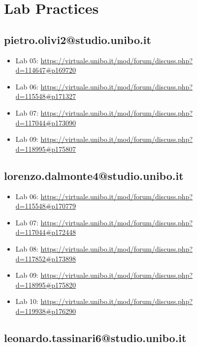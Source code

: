 \documentclass[a4paper,12pt]{report}
\begin{document}
\chapter{Lab Practices}
\section*{pietro.olivi2@studio.unibo.it}
\begin{itemize}
	\item Lab 05: \url{https://virtuale.unibo.it/mod/forum/discuss.php?d=114647#p169720}
	\item Lab 06: \url{https://virtuale.unibo.it/mod/forum/discuss.php?d=115548#p171327}
	\item Lab 07: \url{https://virtuale.unibo.it/mod/forum/discuss.php?d=117044#p173090}
	\item Lab 09: \url{https://virtuale.unibo.it/mod/forum/discuss.php?d=118995#p175807}
\end{itemize}

\section*{lorenzo.dalmonte4@studio.unibo.it}

\begin{itemize}
	\item Lab 06: \url{https://virtuale.unibo.it/mod/forum/discuss.php?d=115548#p170779}
	\item Lab 07: \url{https://virtuale.unibo.it/mod/forum/discuss.php?d=117044#p172448}
	\item Lab 08: \url{https://virtuale.unibo.it/mod/forum/discuss.php?d=117852#p173898}
	\item Lab 09: \url{https://virtuale.unibo.it/mod/forum/discuss.php?d=118995#p175820}
	\item Lab 10: \url{https://virtuale.unibo.it/mod/forum/discuss.php?d=119938#p176290}
\end{itemize}
\section*{leonardo.tassinari6@studio.unibo.it}
\end{document}
